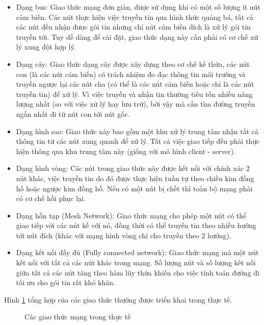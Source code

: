 \documentclass{hust}
\begin{document}
\begin{itemize}
	\item Dạng bus: Giao thức mạng đơn giản, được sử dụng khi có một số lượng ít nút cảm biến. Các nút thực hiện việc truyền tin qua hình thức quảng bá, tất cả các nút đều nhận được gói tin nhưng chỉ nút cảm biến đích là xử lý gói tin truyền tới. Tuy dễ dàng để cài đặt, giao thức dạng này cần phải có cơ chế xử lý xung đột hợp lý.
	\item Dạng cây: Giao thức dạng cây được xây dựng theo cơ chế kế thừa, các nút con (là các nút cảm biến) có trách nhiệm đo đạc thông tin môi trường và truyền ngược lại các nút cha (có thể là các nút cảm biến hoặc chỉ là các nút truyền tin) để xử lý. Vì việc truyền và nhận tin thường tiêu tốn nhiều năng lượng nhất (so với việc xử lý hay lưu trữ), bởi vậy mà cần tìm đường truyền ngắn nhất đi từ nút con tới nút gốc.
	\item Dạng hình sao: Giao thức này bao gồm một khu xử lý trung tâm nhận tất cả thông tin từ các nút xung quanh để xử lý. Tất cả việc giao tiếp đều phải thực hiện thông qua khu trung tâm này (giống với mô hình client - server). 
	\item Dạng hình vòng: Các nút trong giao thức này được kết nối với chính xác 2 nút khác, việc truyền tin do đó được thực hiện tuần tự theo chiều kim đồng hồ hoặc ngược kim đồng hồ. Nếu có một nút bị chết thì toàn bộ mạng phải có cơ chế hồi phục lại.
	\item Dạng hỗn tạp (Mesh Network): Giao thức mạng cho phép một nút có thể giao tiếp với các nút kề với nó, đồng thời có thể truyền tin theo nhiều hướng tới nút đích (khác với mạng hình vòng chỉ cho truyền theo 2 hướng).
	\item Dạng kết nối đầy đủ (Fully connected network): Giao thức mạng mà một nút kết nối với tất cả các nút khác trong mạng. Số lượng nút và số lượng kết nối giữa tất cả các nút tăng theo hàm lũy thừa khiến cho việc tính toán đường đi tối ưu cho gói tin rất khó khăn.
\end{itemize}

Hình \ref{fig:wsn-topology} tổng hợp của các giao thức thường được triển khai trong thực tế.


\begin{figure}[htb]
	\caption{Các giao thức mạng trong thực tế}\label{fig:wsn-topology}
\end{figure}
\end{document}
